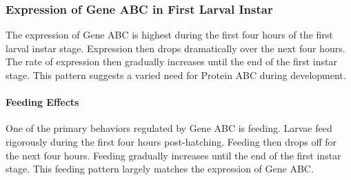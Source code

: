 \subsubsection{Expression of Gene ABC in First Larval Instar}

The expression of Gene ABC is highest during the first four hours of the first larval instar stage. Expression then drops dramatically over the next four hours. The rate of expression then gradually increases until the end of the first instar stage. This pattern suggests a varied need for Protein ABC during development. 

\paragraph{Feeding Effects}
One of the primary behaviors regulated by Gene ABC is feeding. Larvae feed rigorously during the first four hours post-hatching. Feeding then drops off for the next four hours. Feeding gradually increases until the end of the first instar stage. This feeding pattern largely matches the expression of Gene ABC. 





